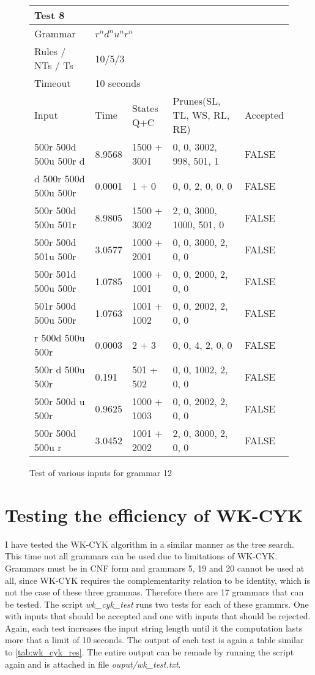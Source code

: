 \begin{figure}[h]
\centering
  \caption{Test of various inputs for grammar 12}
  \label{tab:input_compl_test_8}
\begin{tabular}{ |l|l|l|l|l|  }
  \hline
  \multicolumn{5}{|l|}{Test 8} \\
  \hline
  Grammar & \multicolumn{4}{|l|}{$r^n d^n u^n r^n$} \\
  Rules / NTs / Ts & \multicolumn{4}{|l|}{10/5/3} \\
  Timeout & \multicolumn{4}{|l|}{10 seconds} \\
  \hline
  Input & Time & States Q+C & Prunes(SL, TL, WS, RL, RE) & Accepted \\
  \hline
 500r 500d 500u 500r d & 8.9568 & 1500 + 3001 & 0, 0, 3002, 998, 501, 1 & FALSE \\
 d 500r 500d 500u 500r & 0.0001 & 1 + 0 & 0, 0, 2, 0, 0, 0 & FALSE \\
 500r 500d 500u 501r & 8.9805 & 1500 + 3002 & 2, 0, 3000, 1000, 501, 0 & FALSE \\
 500r 500d 501u 500r & 3.0577 & 1000 + 2001 & 0, 0, 3000, 2, 0, 0 & FALSE \\
 500r 501d 500u 500r & 1.0785 & 1000 + 1001 & 0, 0, 2000, 2, 0, 0 & FALSE \\
 501r 500d 500u 500r & 1.0763 & 1001 + 1002 & 0, 0, 2002, 2, 0, 0 & FALSE \\
 r 500d 500u 500r & 0.0003 & 2 + 3 & 0, 0, 4, 2, 0, 0 & FALSE \\
 500r d 500u 500r & 0.191 & 501 + 502 & 0, 0, 1002, 2, 0, 0 & FALSE \\
 500r 500d u 500r & 0.9625 & 1000 + 1003 & 0, 0, 2002, 2, 0, 0 & FALSE \\
 500r 500d 500u r & 3.0452 & 1001 + 2002 & 2, 0, 3000, 2, 0, 0 & FALSE \\

  \hline
\end{tabular}
\end{figure}


\section{Testing the efficiency of WK-CYK}

I have tested the WK-CYK algorithm in a similar manner as the tree search. This time not all grammars can be used due to limitations of WK-CYK. Grammars must be in CNF form and grammars 5, 19 and 20 cannot be used at all, since WK-CYK requires the complementarity relation to be identity, which is not the case of these three grammas. Therefore there are 17 grammars that can be tested. The script \textit{wk\_cyk\_test} runs two tests for each of these grammrs. One with inputs that should be accepted and one with inputs that should be rejected. Again, each test increases the input string length until it the computation lasts more that a limit of 10 seconds. The output of each test is again a table similar to \ref{tab:wk_cyk_res}. The entire output can be remade by running the script again and is attached in file \textit{ouput/wk\_test.txt}.


